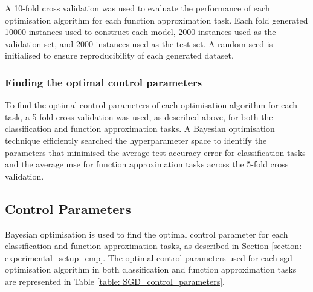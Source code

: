 \documentclass[10pt, conference]{IEEEtran}
\begin{document}
A 10-fold cross validation was used to evaluate the performance of each optimisation algorithm
for each function approximation task. Each fold generated 10000 instances used to construct
each model, 2000 instances used as the validation set, and 2000 instances used as the test set.
A random seed is initialised to ensure reproducibility of each generated dataset.

\subsubsection{Finding the optimal control parameters}
To find the optimal control parameters of each optimisation algorithm for each task, a 5-fold
cross validation was used, as described above, for both the classification and function approximation
tasks. A Bayesian optimisation technique efficiently searched the hyperparameter space
to identify the parameters that minimised the average test accuracy error for classification tasks and the
average \acrshort{mse} for function approximation tasks across the 5-fold cross validation.

\subsection{Control Parameters} \label{section: control_parameters}

Bayesian optimisation is used to find the optimal control parameter for each classification and
function approximation tasks, as described in Section \ref{section: experimental_setup_emp}.
The optimal control parameters used for each \acrshort{sgd} optimisation algorithm in both
classification and function approximation tasks are represented in Table
\ref{table: SGD_control_parameters}.
\end{document}
